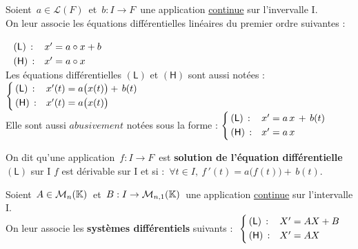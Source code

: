 Soient \(\, a\in \mathscr{L}(F)\, \) et \(\, b:I\to F\,\) une application \underline{continue} sur l'invervalle I.\vspace{-0.3cm} \\
On leur associe les équations différentielles linéaires du premier ordre suivantes :\(\; \begin{array}{ll}
    & \\
    (\mathsf{L})\, : & x'=a\circ x+b\vspace{0.1cm} \\
    (\mathsf{H})\,: & x'=a\circ x
\end{array}\)\vspace{0.4cm} \\
Les équations différentielles $(\mathsf{L})$ et $(\mathsf{H})$ sont aussi notées : \(
\left\{\!\!\begin{array}{ll}
    (\mathsf{L})\,: & x'(t)=a\bigl(x(t)\bigr)+\,b(t)\vspace{0.1cm}\\
    (\mathsf{H})\,: & x'(t)=a\bigl(x(t)\bigr)
\end{array}\right.\)\vspace{0.5cm}\\
Elle sont aussi $abusivement$ notées sous la forme : \(
    \left\{\!\!\begin{array}{ll}
        (\mathsf{L})\,: & x'=a\,x\,+\,b(t)\vspace{0.1cm}\\
        (\mathsf{H})\,: & x'=a\,x
    \end{array}\right.\)

\vspace{0.8cm}

On dit qu'une application \(\,f:I\to F\,\) est \textbf{solution de l'équation différentielle} $(\mathsf{L})$ sur I \ssi $f$ est dérivable sur I et si : \(\, \forall t\in I,\ f\,'(t)=a\bigl(f(t)\bigr)+\,b(t).\)

\vspace{1.7cm}

Soient \(\,A\in \mathcal{M}_n(\mathbb{K})\,\) et \(\,B:I\to \mathcal{M}_{n,1}(\mathbb{K})\,\) une application \underline{continue} sur l'intervalle I.\vspace{0.3cm}\\
On leur associe les \textbf{systèmes différentiels} suivants : \(\ \left\{\!\! 
\begin{array}{ll}
    (\mathsf{L})\,: & X'=A X+B\vspace{0.1cm}\\
    (\mathsf{H})\,: & X'=A X
\end{array}\right.\)

